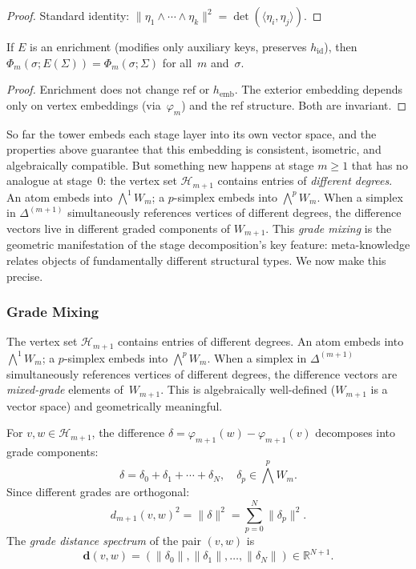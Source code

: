 \begin{proof}
Standard identity: $\|\eta_1 \wedge \cdots \wedge \eta_k\|^2 = \det(\langle \eta_i, \eta_j \rangle)$.
\end{proof}

\begin{theorem}
If $E$ is an enrichment (modifies only auxiliary keys, preserves $h_{\mathrm{id}}$), then $\Phi_m(\sigma; E(\Sigma)) = \Phi_m(\sigma; \Sigma)$ for all~$m$ and~$\sigma$.
\end{theorem}

\begin{proof}
Enrichment does not change $\mathrm{ref}$ or $h_{\mathrm{emb}}$. The exterior embedding depends only on vertex embeddings (via~$\varphi_m$) and the ref structure. Both are invariant.
\end{proof}

\medskip

So far the tower embeds each stage layer into its own vector space, and the properties above guarantee that this embedding is consistent, isometric, and algebraically compatible. But something new happens at stage $m \geq 1$ that has no analogue at stage~0: the vertex set $\mathcal{H}_{m+1}$ contains entries of \emph{different degrees}. An atom embeds into $\bigwedge^1 W_m$; a $p$-simplex embeds into $\bigwedge^p W_m$. When a simplex in $\Delta^{(m+1)}$ simultaneously references vertices of different degrees, the difference vectors live in different graded components of $W_{m+1}$. This \emph{grade mixing} is the geometric manifestation of the stage decomposition's key feature: meta-knowledge relates objects of fundamentally different structural types. We now make this precise.

\subsubsection*{Grade Mixing}

The vertex set $\mathcal{H}_{m+1}$ contains entries of different degrees. An atom embeds into $\bigwedge^1 W_m$; a $p$-simplex embeds into $\bigwedge^p W_m$. When a simplex in $\Delta^{(m+1)}$ simultaneously references vertices of different degrees, the difference vectors are \emph{mixed-grade} elements of~$W_{m+1}$. This is algebraically well-defined ($W_{m+1}$ is a vector space) and geometrically meaningful.

\begin{definition}
For $v, w \in \mathcal{H}_{m+1}$, the difference $\delta = \varphi_{m+1}(w) - \varphi_{m+1}(v)$ decomposes into grade components:
\[
  \delta = \delta_0 + \delta_1 + \cdots + \delta_N, \quad \delta_p \in \textstyle\bigwedge^p W_m.
\]
Since different grades are orthogonal:
\[
  d_{m+1}(v,w)^2 = \|\delta\|^2 = \sum_{p=0}^{N} \|\delta_p\|^2.
\]
The \emph{grade distance spectrum} of the pair $(v,w)$ is
\[
  \mathbf{d}(v,w) = (\|\delta_0\|, \|\delta_1\|, \ldots, \|\delta_N\|) \in \mathbb{R}^{N+1}.
\]
\end{definition}


